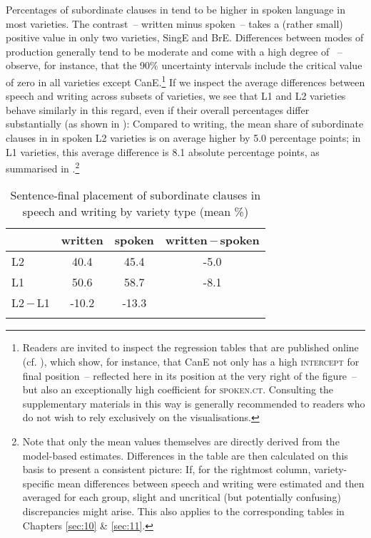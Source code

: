 Percentages of subordinate clauses in  tend to be higher in spoken language in most varieties. The contrast~– written minus spoken~– takes a (rather small) positive value in only two varieties, SingE and BrE. Differences between modes of production generally tend to be moderate and come with a high degree of ~– observe, for instance, that the 90\% uncertainty intervals include the critical value of zero in all varieties except CanE.\footnote{Readers are invited to inspect the regression tables that are published online (cf. ), which show, for instance, that CanE not only has a high \textsc{intercept} for final position~– reflected here in its position at the very right of the figure~– but also an exceptionally high coefficient for \textsc{spoken.ct}. Consulting the supplementary materials in this way is generally recommended to readers who do not wish to rely exclusively on the visualisations.} If we inspect the average differences between speech and writing across subsets of varieties, we see that L1 and L2 varieties behave similarly in this regard, even if their overall percentages differ substantially (as shown in ): Compared to writing, the mean share of subordinate clauses in  in spoken L2 varieties is on average higher by 5.0 percentage points; in L1 varieties, this average difference is 8.1 absolute percentage points, as summarised in .\footnote{Note that only the mean values themselves are directly derived from the model-based estimates. Differences in the table are then calculated on this basis to present a consistent picture: If, for the rightmost column, variety-specific mean differences between speech and writing were estimated and then averaged for each group, slight and uncritical (but potentially confusing) discrepancies might arise. This also applies to the corresponding tables in Chapters \ref{sec:10} \& \ref{sec:11}.\label{fn87}}\largerpage

\begin{table}
\caption{\label{bkm:Ref51144092}\label{tab:9.1}Sentence-final placement of subordinate clauses in speech and writing by variety type (mean \%)}
\begin{tabular}{l *3{S[table-format=-2.1]}}
\lsptoprule
& {written} & {spoken} & {written\,$-$\,spoken}\\\midrule
{}L2 & 40.4 & 45.4 & -5.0\\
L1 & 50.6 & 58.7 & -8.1\\
L2\,$-$\,L1 & -10.2 & -13.3 & \\
\lspbottomrule
\end{tabular}
\end{table}


